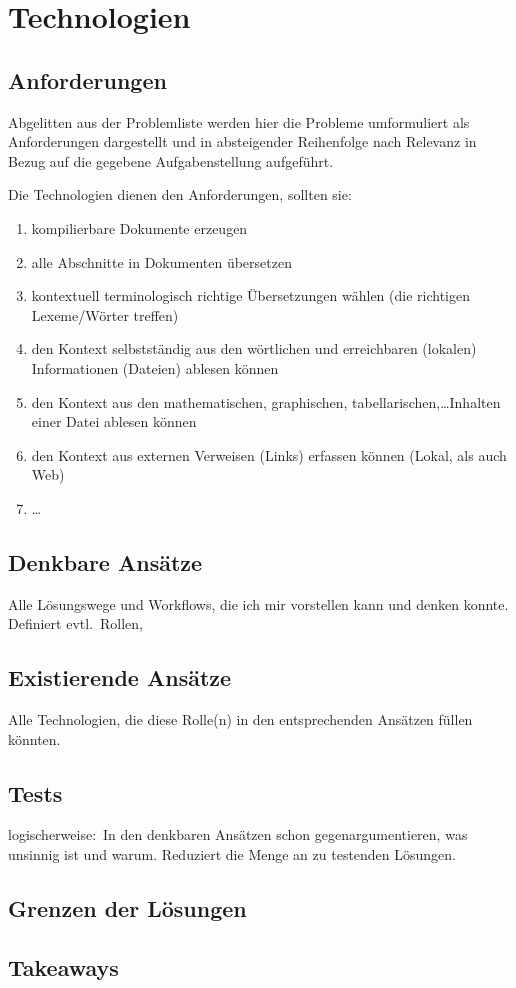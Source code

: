 \section{Technologien}
\subsection{Anforderungen}\label{technologies:demands}
Abgelitten aus der Problemliste werden hier die Probleme umformuliert als Anforderungen dargestellt und in absteigender Reihenfolge nach Relevanz in Bezug auf die gegebene Aufgabenstellung aufgeführt.

Die Technologien dienen den Anforderungen, sollten sie:\ 
\begin{enumerate}
    \item kompilierbare Dokumente erzeugen
    \item alle Abschnitte in Dokumenten übersetzen
    \item kontextuell terminologisch richtige Übersetzungen wählen (die richtigen Lexeme/Wörter treffen)%
    \item den Kontext selbstständig aus den wörtlichen und erreichbaren (lokalen) Informationen (Dateien) ablesen können
    \item den Kontext aus den mathematischen, graphischen, tabellarischen,\ldots Inhalten einer Datei ablesen können
    \item den Kontext aus externen Verweisen (Links) erfassen können (Lokal, als auch Web)
    \item \ldots
\end{enumerate}
\subsection{Denkbare Ansätze}%
Alle Lösungswege und Workflows, die ich mir vorstellen kann und denken konnte. Definiert evtl.\ Rollen,
\subsection{Existierende Ansätze}%
Alle Technologien, die diese Rolle(n) in den entsprechenden Ansätzen füllen könnten.
\subsection{Tests}%
logischerweise:\ In den denkbaren Ansätzen schon gegenargumentieren, was unsinnig ist und warum. Reduziert die Menge an zu testenden Lösungen.
\subsection{Grenzen der Lösungen}%
\subsection{Takeaways}%